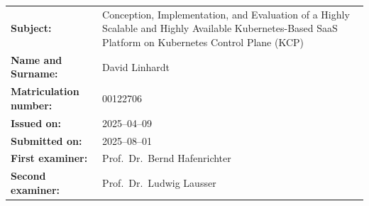 \documentclass[11pt, a4paper, oneside, listof=totoc]{scrartcl}
\newcommand{\thesistitle}{Conception, Implementation, and Evaluation of a Highly Scalable and Highly Available Kubernetes-Based SaaS Platform on Kubernetes Control Plane (KCP)}
\begin{document}
\begin{titlepage}
        \begin{tabularx}{\textwidth}{@{}lX@{}}
            \textbf{Subject:} & \thesistitle\\[2cm]
            \textbf{Name and Surname:} & David Linhardt \\[0.5cm]
            \textbf{Matriculation number:} & 00122706\\[2cm]     
            \textbf{Issued on:} & 2025--04--09 \\[0.5cm]           
            \textbf{Submitted on:} & 2025--08--01 \\[2cm]           
            \textbf{First examiner:} & Prof.\ Dr.\ Bernd Hafenrichter \\[0.5cm]      
            \textbf{Second examiner:} & Prof.\ Dr.\ Ludwig Lausser \\
        \end{tabularx}

    \end{titlepage}
\end{document}
